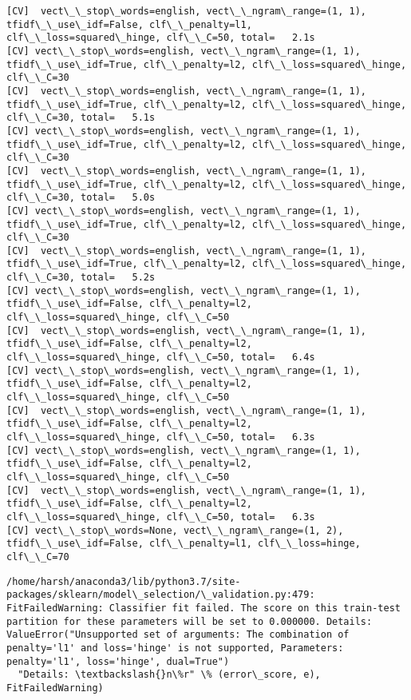\documentclass[11pt]{article}
\begin{document}
    \begin{Verbatim}[commandchars=\\\{\}]
[CV]  vect\_\_stop\_words=english, vect\_\_ngram\_range=(1, 1), tfidf\_\_use\_idf=False, clf\_\_penalty=l1, clf\_\_loss=squared\_hinge, clf\_\_C=50, total=   2.1s
[CV] vect\_\_stop\_words=english, vect\_\_ngram\_range=(1, 1), tfidf\_\_use\_idf=True, clf\_\_penalty=l2, clf\_\_loss=squared\_hinge, clf\_\_C=30 
[CV]  vect\_\_stop\_words=english, vect\_\_ngram\_range=(1, 1), tfidf\_\_use\_idf=True, clf\_\_penalty=l2, clf\_\_loss=squared\_hinge, clf\_\_C=30, total=   5.1s
[CV] vect\_\_stop\_words=english, vect\_\_ngram\_range=(1, 1), tfidf\_\_use\_idf=True, clf\_\_penalty=l2, clf\_\_loss=squared\_hinge, clf\_\_C=30 
[CV]  vect\_\_stop\_words=english, vect\_\_ngram\_range=(1, 1), tfidf\_\_use\_idf=True, clf\_\_penalty=l2, clf\_\_loss=squared\_hinge, clf\_\_C=30, total=   5.0s
[CV] vect\_\_stop\_words=english, vect\_\_ngram\_range=(1, 1), tfidf\_\_use\_idf=True, clf\_\_penalty=l2, clf\_\_loss=squared\_hinge, clf\_\_C=30 
[CV]  vect\_\_stop\_words=english, vect\_\_ngram\_range=(1, 1), tfidf\_\_use\_idf=True, clf\_\_penalty=l2, clf\_\_loss=squared\_hinge, clf\_\_C=30, total=   5.2s
[CV] vect\_\_stop\_words=english, vect\_\_ngram\_range=(1, 1), tfidf\_\_use\_idf=False, clf\_\_penalty=l2, clf\_\_loss=squared\_hinge, clf\_\_C=50 
[CV]  vect\_\_stop\_words=english, vect\_\_ngram\_range=(1, 1), tfidf\_\_use\_idf=False, clf\_\_penalty=l2, clf\_\_loss=squared\_hinge, clf\_\_C=50, total=   6.4s
[CV] vect\_\_stop\_words=english, vect\_\_ngram\_range=(1, 1), tfidf\_\_use\_idf=False, clf\_\_penalty=l2, clf\_\_loss=squared\_hinge, clf\_\_C=50 
[CV]  vect\_\_stop\_words=english, vect\_\_ngram\_range=(1, 1), tfidf\_\_use\_idf=False, clf\_\_penalty=l2, clf\_\_loss=squared\_hinge, clf\_\_C=50, total=   6.3s
[CV] vect\_\_stop\_words=english, vect\_\_ngram\_range=(1, 1), tfidf\_\_use\_idf=False, clf\_\_penalty=l2, clf\_\_loss=squared\_hinge, clf\_\_C=50 
[CV]  vect\_\_stop\_words=english, vect\_\_ngram\_range=(1, 1), tfidf\_\_use\_idf=False, clf\_\_penalty=l2, clf\_\_loss=squared\_hinge, clf\_\_C=50, total=   6.3s
[CV] vect\_\_stop\_words=None, vect\_\_ngram\_range=(1, 2), tfidf\_\_use\_idf=False, clf\_\_penalty=l1, clf\_\_loss=hinge, clf\_\_C=70 

    \end{Verbatim}

    \begin{Verbatim}[commandchars=\\\{\}]
/home/harsh/anaconda3/lib/python3.7/site-packages/sklearn/model\_selection/\_validation.py:479: FitFailedWarning: Classifier fit failed. The score on this train-test partition for these parameters will be set to 0.000000. Details: 
ValueError("Unsupported set of arguments: The combination of penalty='l1' and loss='hinge' is not supported, Parameters: penalty='l1', loss='hinge', dual=True")
  "Details: \textbackslash{}n\%r" \% (error\_score, e), FitFailedWarning)

    \end{Verbatim}
\end{document}
